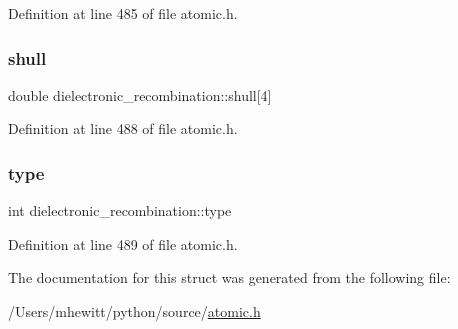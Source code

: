 Definition at line 485 of file atomic.\+h.

\mbox{\label{structdielectronic__recombination_a5dfa371f0eee66a4816ad6b1b3768153}} 
\subsubsection{\texorpdfstring{shull}{shull}}
{\footnotesize\ttfamily double dielectronic\+\_\+recombination\+::shull\mbox{[}4\mbox{]}}



Definition at line 488 of file atomic.\+h.

\mbox{\label{structdielectronic__recombination_a69ec8ee001dbdce4ffdd7a17a6ae8720}} 
\subsubsection{\texorpdfstring{type}{type}}
{\footnotesize\ttfamily int dielectronic\+\_\+recombination\+::type}



Definition at line 489 of file atomic.\+h.



The documentation for this struct was generated from the following file\+:\begin{DoxyCompactItemize}
\item 
/\+Users/mhewitt/python/source/\hyperlink{atomic_8h}{atomic.\+h}\end{DoxyCompactItemize}
